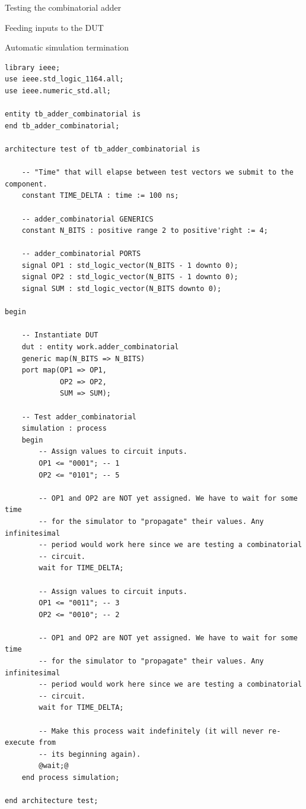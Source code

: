 \documentclass[lab]{course}
\begin{document}
\begin{section}{Testing the combinatorial adder}
\begin{subsection}{Feeding inputs to the DUT}
\begin{subsubsection}{Automatic simulation termination}
            \begin{lstlisting}[caption={Indefinite \texttt{wait} statement added to simulation process}, label={lst:combinatorial_indefinite_wait_statement_added_to_simulation_process}]
library ieee;
use ieee.std_logic_1164.all;
use ieee.numeric_std.all;

entity tb_adder_combinatorial is
end tb_adder_combinatorial;

architecture test of tb_adder_combinatorial is

    -- "Time" that will elapse between test vectors we submit to the component.
    constant TIME_DELTA : time := 100 ns;

    -- adder_combinatorial GENERICS
    constant N_BITS : positive range 2 to positive'right := 4;

    -- adder_combinatorial PORTS
    signal OP1 : std_logic_vector(N_BITS - 1 downto 0);
    signal OP2 : std_logic_vector(N_BITS - 1 downto 0);
    signal SUM : std_logic_vector(N_BITS downto 0);

begin

    -- Instantiate DUT
    dut : entity work.adder_combinatorial
    generic map(N_BITS => N_BITS)
    port map(OP1 => OP1,
             OP2 => OP2,
             SUM => SUM);

    -- Test adder_combinatorial
    simulation : process
    begin
        -- Assign values to circuit inputs.
        OP1 <= "0001"; -- 1
        OP2 <= "0101"; -- 5

        -- OP1 and OP2 are NOT yet assigned. We have to wait for some time
        -- for the simulator to "propagate" their values. Any infinitesimal
        -- period would work here since we are testing a combinatorial
        -- circuit.
        wait for TIME_DELTA;

        -- Assign values to circuit inputs.
        OP1 <= "0011"; -- 3
        OP2 <= "0010"; -- 2

        -- OP1 and OP2 are NOT yet assigned. We have to wait for some time
        -- for the simulator to "propagate" their values. Any infinitesimal
        -- period would work here since we are testing a combinatorial
        -- circuit.
        wait for TIME_DELTA;

        -- Make this process wait indefinitely (it will never re-execute from
        -- its beginning again).
        @wait;@
    end process simulation;

end architecture test;
            \end{lstlisting}


\end{subsubsection}
\end{subsection}
\end{section}
\end{document}
